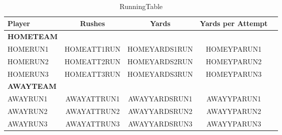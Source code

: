 \begin{table}[htbp]\
\def\sym#1{\ifmmode^{#1}\else\(^{#1}\)\fi}
\caption{RunningTable\label{tab1}}
{
\centering
\begin{tabular}{l*{4}{c}}
\hline\hline
            Player&\multicolumn{1}{c}{Rushes}&\multicolumn{1}{c}{Yards}&\multicolumn{1}{c}{Yards per Attempt}\\
\hline
\textbf{HOMETEAM}\\
HOMERUN1 &     HOMEATT1RUN&    HOMEYARDS1RUN&  HOMEYPARUN1\\
HOMERUN2 &     HOMEATT2RUN&    HOMEYARDS2RUN&  HOMEYPARUN2\\
HOMERUN3 &     HOMEATT3RUN&    HOMEYARDS3RUN&  HOMEYPARUN3\\
[1em]
\textbf{AWAYTEAM}\\
AWAYRUN1 &     AWAYATTRUN1&    AWAYYARDSRUN1&  AWAYYPARUN1\\
AWAYRUN2 &     AWAYATTRUN2&    AWAYYARDSRUN2&  AWAYYPARUN2\\
AWAYRUN3 &     AWAYATTRUN3&    AWAYYARDSRUN3&  AWAYYPARUN3\\
\hline\hline
\end{tabular}
}
\label{tab:run}
\end{table}
